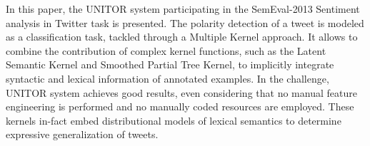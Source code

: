 In this paper, the UNITOR system participating in the SemEval-2013 Sentiment analysis in Twitter task is presented. The polarity detection of a tweet is
 modeled as a classification task, tackled through a Multiple Kernel approach.
 It allows to combine the contribution of complex kernel functions, such as the
 Latent Semantic Kernel and Smoothed Partial Tree Kernel, to implicitly
 integrate syntactic and lexical information of annotated examples. In the
 challenge, UNITOR system achieves good results, even considering that no manual
 feature engineering is performed and no manually coded resources are employed.
 These kernels in-fact embed distributional models of lexical semantics to
 determine expressive generalization of tweets.

